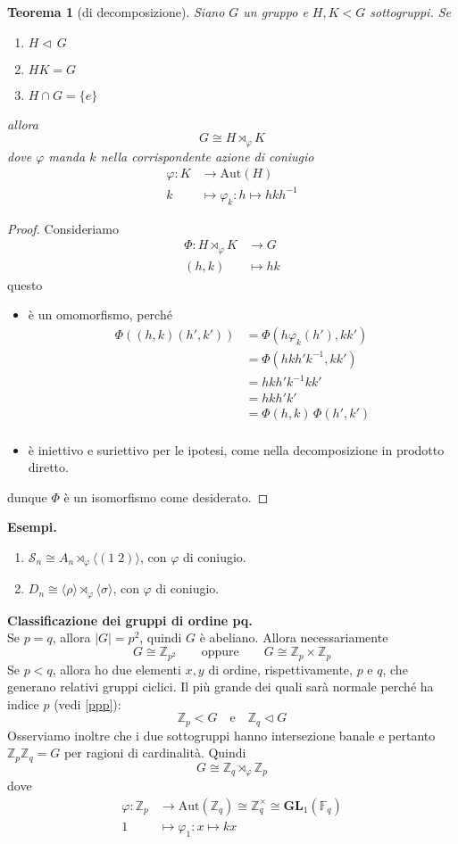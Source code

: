 \documentclass[a4paper]{article}
\newtheorem{theorem}{Teorema}[section]
\theoremstyle{remark}
\theoremstyle{definition}
\newcommand{\Aut}[1]{\mathrm{Aut}\left( #1 \right)}
\newcommand{\Z}{\mathbb{Z}}
\newcommand{\fun}[5]{\begin{align*}
	#1 \colon #2 &\to #3 \\
	#4 &\mapsto #5
	\end{align*}}
\begin{document}
\begin{multicols}{2}
\begin{theorem}[di decomposizione]
	Siano $ G $ un gruppo e $ H, K < G $ sottogruppi. Se
	\begin{enumerate}
		\item $ H \lhd\, G $
		\item $ HK = G $
		\item $ H \cap G = \{e\} $
	\end{enumerate}
allora $$  G \cong H \rtimes_\varphi K  $$ dove $ \varphi $ manda $ k $ nella corrispondente azione di coniugio \fun{\varphi}{K}{\Aut{H}}{k}{\varphi_k : h \mapsto hkh^{-1}}
\end{theorem}
\begin{proof}
	Consideriamo \fun{\Phi}{H \rtimes_\varphi K}{G}{(h, k)}{hk}
	questo
	\begin{itemize}
		\item è un omomorfismo, perché \begin{align*}
			\Phi((h, k)(h', k')) &= \Phi(h\varphi_k(h'), kk') \\
			&= \Phi(hkh'k^{-1}, kk') \\
			&= hkh'k^{-1}kk' \\
			&= hkh'k'\\
			&= \Phi(h, k)\,\Phi(h', k')\\
		\end{align*}
		\item è iniettivo e suriettivo per le ipotesi, come nella decomposizione in prodotto diretto.
	\end{itemize}
dunque $ \Phi $ è un isomorfismo come desiderato.
\end{proof}

\textbf{Esempi.}
\begin{enumerate}
	\item $ \mathcal{S}_n \cong A_n \rtimes_\varphi \langle (1 \; 2) \rangle $, con $ \varphi $ di coniugio.
	\item $ D_n \cong \langle \rho \rangle \rtimes_\varphi \langle \sigma \rangle $, con $ \varphi $ di coniugio.
\end{enumerate}

\columnbreak
\textbf{Classificazione dei gruppi di ordine pq.} \\

Se $ p = q $, allora $ |G| = p^2 $, quindi $ G $ è abeliano. Allora necessariamente
\[ G \cong \mathbb{Z}_{p^2}  \qquad \text{oppure} \qquad G \cong \mathbb{Z}_{p}\times\mathbb{Z}_{p} \]
Se $ p < q $, allora ho due elementi $ x, y $ di ordine, rispettivamente, $ p $ e $ q $, che generano relativi gruppi ciclici. Il più grande dei quali sarà normale perché ha indice $ p $ (vedi \ref{ppp}):
$$  \mathbb{Z}_p < G \quad\text{e}\quad \Z_q \lhd G $$
Osserviamo inoltre che i due sottogruppi hanno intersezione banale e pertanto $ \Z_p\Z_q = G $ per ragioni di cardinalità. Quindi
\[ G \cong \Z_q \rtimes_{\varphi} \Z_p \]
dove
\fun{\varphi}{\Z_p}{\Aut{\Z_q}  \cong \mathbb{Z}_q^\times \cong \mathbf{GL}_1(\mathbb{F}_q)}{1}{\varphi_1: x \mapsto kx}


\end{multicols}
\end{document}
